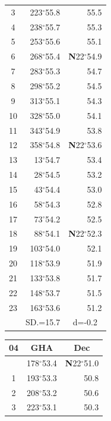 \documentclass[10pt, a4paper]{report}
\begin{document}
\begin{scriptsize}
\begin{tabular*}{0.2\textwidth}[t]{@{\extracolsep{\fill}}|c|rr|}
3 & 223$^\circ$55.8 & \raisebox{0.24ex}{\boldmath$\cdot$~\boldmath$\cdot$~~}55.5\\
4 & 238$^\circ$55.7 & 55.3\\
5 & 253$^\circ$55.6 & 55.1\\[2Pt]
6 & 268$^\circ$55.4 & \textbf{N}22$^\circ$54.9\\
7 & 283$^\circ$55.3 & 54.7\\
8 & 298$^\circ$55.2 & 54.5\\
9 & 313$^\circ$55.1 & \raisebox{0.24ex}{\boldmath$\cdot$~\boldmath$\cdot$~~}54.3\\
10 & 328$^\circ$55.0 & 54.1\\
11 & 343$^\circ$54.9 & 53.8\\[2Pt]
12 & 358$^\circ$54.8 & \textbf{N}22$^\circ$53.6\\
13 & 13$^\circ$54.7 & 53.4\\
14 & 28$^\circ$54.5 & 53.2\\
15 & 43$^\circ$54.4 & \raisebox{0.24ex}{\boldmath$\cdot$~\boldmath$\cdot$~~}53.0\\
16 & 58$^\circ$54.3 & 52.8\\
17 & 73$^\circ$54.2 & 52.5\\[2Pt]
18 & 88$^\circ$54.1 & \textbf{N}22$^\circ$52.3\\
19 & 103$^\circ$54.0 & 52.1\\
20 & 118$^\circ$53.9 & 51.9\\
21 & 133$^\circ$53.8 & \raisebox{0.24ex}{\boldmath$\cdot$~\boldmath$\cdot$~~}51.7\\
22 & 148$^\circ$53.7 & 51.5\\
23 & 163$^\circ$53.6 & 51.2\\
\hline
\rule{0pt}{2.4ex} & \multicolumn{1}{c}{SD.=15.7} & \multicolumn{1}{c|}{d=-0.2}\\
\hline
\end{tabular*}\noindent
\begin{tabular*}{0.2\textwidth}[t]{@{\extracolsep{\fill}}|c|rr|}
\hline
\multicolumn{1}{|c|}{\rule{0pt}{2.6ex}\textbf{04}} & \multicolumn{1}{c}{\textbf{GHA}} & \multicolumn{1}{c|}{\textbf{Dec}}\\
\hline\rule{0pt}{2.6ex}\noindent
0 & 178$^\circ$53.4 & \textbf{N}22$^\circ$51.0\\
1 & 193$^\circ$53.3 & 50.8\\
2 & 208$^\circ$53.2 & 50.6\\
3 & 223$^\circ$53.1 & \raisebox{0.24ex}{\boldmath$\cdot$~\boldmath$\cdot$~~}50.3\\

\end{tabular*}
\end{scriptsize}
\end{document}
